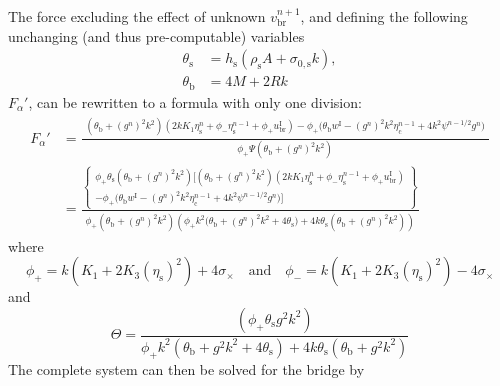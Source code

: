 \documentclass{article}
\begin{document}
The force excluding the effect of unknown $v_\text{br}^{n+1}$, and defining the following unchanging (and thus pre-computable) variables
\begin{align}
    \theta_\text{s} &= h_\text{s}(\rho_\text{s}A+\sigma_{0,\text{s}}k),\\
    \theta_\text{b} &= 4M + 2Rk
\end{align}
$F_\alpha'$, can be rewritten to a formula with only one division:
\begin{align}\label{eq:fAlphaOneDivision}
    F_\alpha' &= \frac{\begin{gathered}(\theta_\text{b} + (g^n)^2k^2)(2kK_1\eta_\text{s}^n+\phi_-\eta_\text{s}^{n-1} +\phi_+u^\text{I}_\text{br})
    - \phi_+\Big(\theta_\text{b}w^\text{I} - (g^n)^2k^2\eta_\text{c}^{n-1} + 4k^2\psi^{n-1/2}g^n\Big)\end{gathered}}{\phi_+\Psi(\theta_\text{b}+ (g^n)^2k^2)}\\
    &=\frac{\left\{
    \begin{gathered}
    \phi_+\theta_\text{s}(\theta_\text{b}+(g^n)^2k^2)\Big[(\theta_\text{b}+(g^n)^2k^2)(2kK_1\eta_\text{s}^n+\phi_-\eta_\text{s}^{n-1}+\phi_+u_\text{br}^\text{I})\\
    -\phi_+\Big(\theta_\text{b}w^\text{I}-(g^n)^2k^2\eta_\text{c}^{n-1}+4k^2\psi^{n-1/2}g^n\Big)\Big]
    \end{gathered}
    \right\}}{
    \begin{gathered}\phi_+(\theta_\text{b}+(g^n)^2k^2)\left(\phi_+k^2\Big(\theta_\text{b}+(g^n)^2k^2 + 4\theta_\text{s}\Big)+
    4k\theta_\text{s}(\theta_\text{b} +(g^n)^2k^2)\right)
    \end{gathered}}
\end{align}
where 
\begin{equation}
    \phi_+ = k (K_1 + 2 K_3 (\eta_\text{s})^2) + 4 \sigma_\times \quad \text{and} \quad \phi_- = k (K_1 + 2 K_3 (\eta_\text{s})^2) - 4 \sigma_\times
\end{equation}
and 
\begin{equation}
    \Theta = \frac{(\phi_+ \theta_\text{s}g^2k^2)}{\phi_+ k^2(\theta_\text{b}+ g^2k^2 + 4\theta_\text{s}) + 4k\theta_\text{s}(\theta_\text{b} + g^2k^2)}
\end{equation}
The complete system can then be solved for the bridge by
\end{document}
